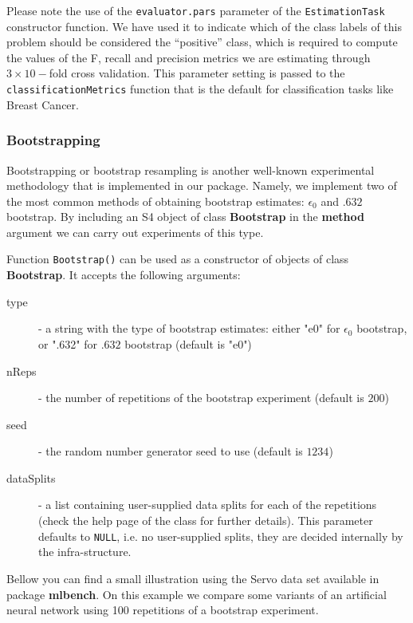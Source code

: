 \documentclass[10pt,a4paper]{article}\usepackage[]{graphicx}\usepackage[]{color}
\begin{document}
Please note the use of the \texttt{evaluator.pars} parameter of the
\texttt{EstimationTask} constructor function. We have used it to indicate which of the class labels of this problem should be considered the ``positive'' class, which is required to compute the values of the F, recall and precision metrics we are estimating through $3\times 10-$fold cross validation. This parameter setting is passed to the \texttt{classificationMetrics} function that is the default for classification tasks like Breast Cancer.

\subsubsection{Bootstrapping}

Bootstrapping or bootstrap resampling is another well-known
experimental methodology that is implemented in our
package. Namely, we implement two of the most common methods of obtaining bootstrap estimates: $\epsilon_0$ and $.632$ bootstrap.
By including an S4 object of class
\textbf{Bootstrap} in the \textbf{method} argument we can carry out experiments of this
type.

Function \texttt{Bootstrap()} can be used as a constructor of
objects of class \textbf{Bootstrap}. It accepts the following
arguments:

\begin{description}
\item[type] - a string with the type of bootstrap estimates: either "e0" for $\epsilon_0$ bootstrap, or ".632" for $.632$ bootstrap (default is "e0")
\item[nReps] - the number of repetitions of the bootstrap experiment (default is $200$)
\item[seed] - the random number generator seed to use (default is $1234$)
\item[dataSplits] - a list containing user-supplied data splits
  for each of the repetitions (check the help page of the
  class for further details). This parameter defaults to
  \texttt{NULL}, i.e. no user-supplied splits, they are decided
  internally by the infra-structure.
\end{description}

Bellow you can find a small illustration using the Servo data set available in package \textbf{mlbench}. On this example we compare some variants of an artificial neural network using 100 repetitions of a bootstrap experiment. 
\end{document}
